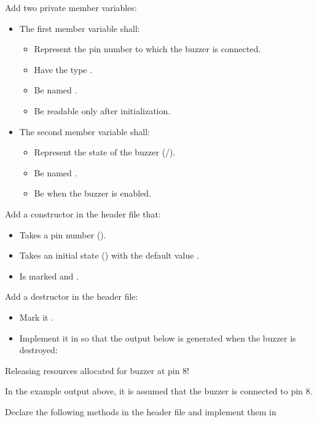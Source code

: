 \begin{parts}
  \item Add two private member variables:
  \begin{itemize}
    \item The first member variable shall:
    \begin{itemize}
      \item Represent the pin number to which the buzzer is connected.
      \item Have the type .
      \item Be named .
      \item Be readable only after initialization.
    \end{itemize}
    \item The second member variable shall:
    \begin{itemize}
      \item Represent the state of the buzzer (/).
      \item Be named .
      \item Be  when the buzzer is enabled.
    \end{itemize}
  \end{itemize}
  \item Add a constructor in the header file that:
  \begin{itemize}
    \item Takes a pin number ().
    \item Takes an initial state () with the default value .
    \item Is marked  and .
  \end{itemize}
  \item Add a destructor in the header file:
  \begin{itemize}
    \item Mark it .
    \item Implement it in  so that the output below is generated when the
      buzzer is destroyed:
  \end{itemize}
\begin{console}
Releasing resources allocated for buzzer at pin 8!
\end{console}
  \note In the example output above, it is assumed that the buzzer is connected to pin 8.
  \item Declare the following methods in the header file and implement them in

\end{parts}
